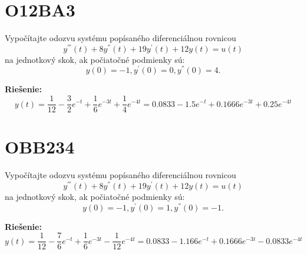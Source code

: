 \documentclass[a4paper, 12pt]{article}
\newenvironment{task}{}{}
\newenvironment{solution}{\noindent\textbf{Riešenie:}}{}
\begin{document}
\section*{O12BA3}
\begin{task}
    Vypočítajte odozvu systému popísaného diferenciálnou rovnicou 
    \begin{equation*}
        y^{'''}(t)+8y^{''}(t)+19y^{'}(t)+12y(t)=u(t)
    \end{equation*}
    na jednotkový skok, ak počiatočné podmienky sú: 
    \begin{equation*}
        y(0)=-1, y^{'}(0)=0, y^{''}(0)=4.    
    \end{equation*}
\end{task} 

\begin{solution}
    \begin{equation*}
        y(t)=\dfrac{1}{12} - \dfrac{3}{2}e^{-t} + \dfrac{1}{6}e^{-3t} + \dfrac{1}{4}e^{-4t} = 0.0833 -1.5 e^{-t} + 0.1666 e^{-3t} + 0.25 e^{-4t}
    \end{equation*}
\end{solution}


\section*{OBB234}
\begin{task}
    Vypočítajte odozvu systému popísaného diferenciálnou rovnicou 
    \begin{equation*}
        y^{'''}(t)+8y^{''}(t)+19y^{'}(t)+12y(t)=u(t)
    \end{equation*}
    na jednotkový skok, ak počiatočné podmienky sú: 
    \begin{equation*}
        y(0)=-1, y^{'}(0)=1, y^{''}(0)=-1.    
    \end{equation*}
\end{task} 

\begin{solution}
    \begin{equation*}
        y(t)=\dfrac{1}{12} - \dfrac{7}{6}e^{-t} + \dfrac{1}{6}e^{-3t} - \dfrac{1}{12}e^{-4t} = 0.0833 -1.166 e^{-t} + 0.1666 e^{-3t} - 0.0833 e^{-4t}
    \end{equation*}
\end{solution}
\end{document}
